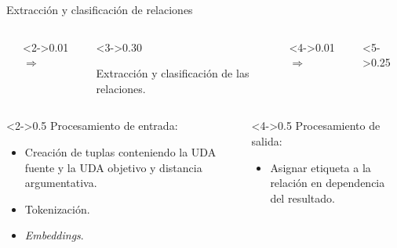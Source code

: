 \documentclass{beamer}
\begin{document}
\begin{frame}{Extracción y clasificación de relaciones}

    \begin{columns}
        \begin{column}{0.25\textwidth}
            
        \end{column}
        \begin{column}<2->{0.01\textwidth}
            \begin{math}
                \Rightarrow
            \end{math}
        \end{column}
        \begin{column}<3->{0.30\textwidth}
            \begin{block}{}
                Extracción y clasificación de las relaciones.
            \end{block}
        \end{column}
        \begin{column}<4->{0.01\textwidth}
            \begin{math}
                \Rightarrow
            \end{math}
        \end{column}
        \begin{column}<5->{0.25\textwidth}
            
        \end{column}
    \end{columns}

    \vspace{1cm}

    \begin{columns}[T]
        \begin{column}<2->{0.5\textwidth}
            Procesamiento de entrada:
            \begin{itemize}
                \item Creación de tuplas conteniendo la UDA fuente y la UDA objetivo y distancia argumentativa.
                \item Tokenización.
                \item \textit{Embeddings}.
            \end{itemize}
        \end{column}
        \begin{column}<4->{0.5\textwidth}
            Procesamiento de salida:
            \begin{itemize}
                \item Asignar etiqueta a la relación en dependencia del resultado.
            \end{itemize}
        \end{column}
    \end{columns}
\end{frame}
\end{document}
